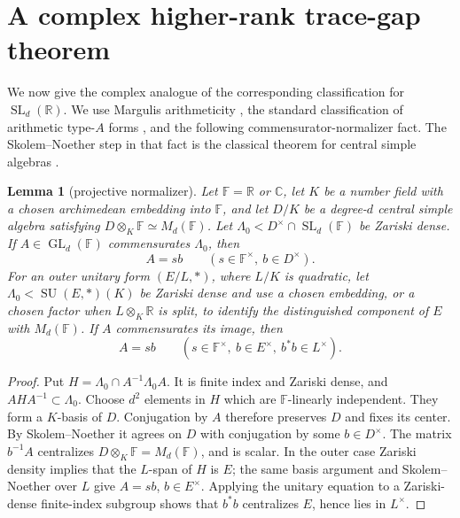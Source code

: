 \documentclass[11pt,reqno]{amsart}
\newtheorem{lemma}[theorem]{Lemma}
\theoremstyle{definition}
\theoremstyle{remark}
\newcommand{\R}{\mathbb R}
\newcommand{\C}{\mathbb C}
\newcommand{\F}{\mathbb F}
\newcommand{\SL}{\operatorname{SL}}
\newcommand{\GL}{\operatorname{GL}}
\newcommand{\SU}{\operatorname{SU}}
\begin{document}
\section{A complex higher-rank trace-gap theorem}

We now give the complex analogue of the corresponding classification for
\(\SL_d(\R)\).  We use Margulis arithmeticity
\cite[Chapter~IX]{Margulis}, the standard classification of arithmetic
type-\(A\) forms \cite{PlatonovRapinchuk}, and the following
commensurator-normalizer fact.  The
Skolem--Noether step in that fact is the classical theorem for central
simple algebras \cite[Section~12.6]{Pierce}.

\begin{lemma}[projective normalizer]\label{lem:normalizer}
Let \(\F=\R\) or \(\C\), let \(K\) be a number field with a chosen
archimedean embedding into \(\F\), and let \(D/K\) be a degree-\(d\) central
simple algebra satisfying \(D\otimes_K\F\simeq M_d(\F)\).  Let
\(\Lambda_0<D^\times\cap\SL_d(\F)\) be Zariski dense.  If
\(A\in\GL_d(\F)\) commensurates \(\Lambda_0\), then
\[
 A=s b\qquad(s\in\F^\times,\ b\in D^\times).
\tag{6.1}
\]
For an outer unitary form \((E/L,*)\), where \(L/K\) is quadratic, let
\(\Lambda_0<\SU(E,*)(K)\) be Zariski dense and use a chosen embedding, or a
chosen factor when \(L\otimes_K\R\) is split, to identify the distinguished
component of \(E\) with \(M_d(\F)\).  If \(A\) commensurates its image, then
\[
 A=sb\qquad(s\in\F^\times,\ b\in E^\times,\ b^*b\in L^\times).
\]
\end{lemma}

\begin{proof}
Put \(H=\Lambda_0\cap A^{-1}\Lambda_0A\).  It is finite index and Zariski
dense, and \(AHA^{-1}\subset\Lambda_0\).  Choose \(d^2\) elements in \(H\)
which are \(\F\)-linearly
independent.  They form a \(K\)-basis of \(D\).  Conjugation by \(A\) therefore
preserves \(D\) and fixes its center.  By Skolem--Noether
\cite[Section~12.6]{Pierce} it agrees on \(D\)
with conjugation by some \(b\in D^\times\).  The matrix \(b^{-1}A\) centralizes
\(D\otimes_K\F=M_d(\F)\), and is scalar.  In the outer case Zariski density
implies that the \(L\)-span of \(H\) is \(E\); the same basis argument and
Skolem--Noether over \(L\) give \(A=sb\), \(b\in E^\times\).  Applying the
unitary equation to a Zariski-dense finite-index subgroup shows that
\(b^*b\) centralizes \(E\), hence lies in \(L^\times\).
\end{proof}
\end{document}
